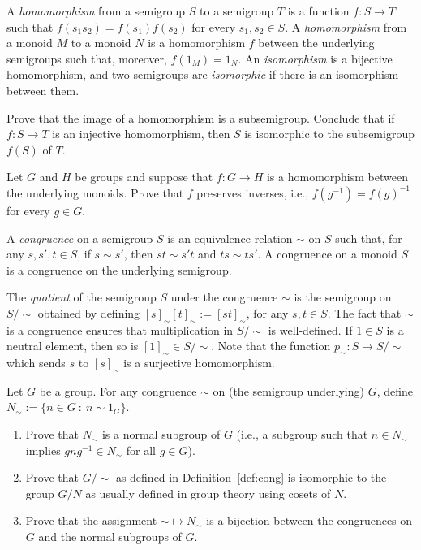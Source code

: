 \begin{definition}
  A \emph{homomorphism} from a semigroup $S$ to a semigroup $T$ is a function $f \colon S \to T$ such that $f(s_1s_2) = f(s_1)f(s_2)$ for every $s_1, s_2 \in S$.  
% 
 A \emph{homomorphism} from a monoid $M$ to a monoid $N$ is a homomorphism $f$ between the underlying semigroups such that, moreover, $f(1_M) = 1_N$. An \emph{isomorphism} is a bijective homomorphism, and two semigroups are \emph{isomorphic} if there is an isomorphism between them.
\end{definition}

\begin{exercise}\easy\label{exe:image}
Prove that the image of a homomorphism is a subsemigroup. Conclude that if $f \colon S \to T$ is an injective homomorphism, then $S$ is isomorphic to the subsemigroup $f(S)$ of $T$.
\end{exercise}
\begin{exercise}\easy
  Let $G$ and $H$ be groups and suppose that $f \colon G \to H$ is a homomorphism between the underlying monoids. Prove that $f$ preserves inverses, i.e., $f(g^{-1}) = f(g)^{-1}$ for every $g \in G$.
\end{exercise}

\begin{definition}\label{def:cong}
  A \emph{congruence} on a semigroup $S$ is an equivalence relation $\sim$ on $S$ such that, for any $s, s', t \in S$, if $s \sim s'$, then $st \sim s't$ and $ts \sim ts'$. A congruence on a monoid $S$ is a congruence on the underlying semigroup.

The \emph{quotient} of the semigroup $S$ under the congruence $\sim$ is the semigroup on $S/{\sim}$ obtained by defining $[s]_\sim [t]_\sim := [st]_\sim$, for any $s, t \in S$. The fact that $\sim$ is a congruence ensures that multiplication in $S/{\sim}$ is well-defined. If $1 \in S$ is a neutral element, then so is $[1]_\sim \in S/{\sim}$. Note that the function $p_\sim \colon S \to S/{\sim}$ which sends $s$ to $[s]_\sim$ is a surjective homomorphism. 
\end{definition}

\begin{exercise}
Let $G$ be a group. For any congruence $\sim$ on (the semigroup underlying) $G$, define $N_\sim := \{n \in G \ \colon \ n \sim 1_G\}$. 
\begin{enumerate}
\item\easy  Prove that $N_\sim$ is a normal subgroup of $G$ (i.e., a subgroup such that $n \in N_\sim$ implies $gng^{-1} \in N_\sim$ for all $g \in G$).
\item\easy Prove that $G/{\sim}$ as defined in Definition~\ref{def:cong} is isomorphic to the group $G/N$ as usually defined in group theory using cosets of $N$.
\item\medium  Prove that the assignment ${\sim} \mapsto {N_\sim}$ is a bijection between the congruences on $G$ and the normal subgroups of $G$.
\end{enumerate}
\end{exercise}

